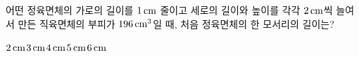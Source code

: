 어떤 정육면체의 가로의 길이를 $1\mkern3mu \mathrm{cm}$ 줄이고 세로의 길이와 높이를 각각 $2\mkern3mu \mathrm{cm}$씩 늘여서 만든 직육면체의 부피가 $196\mkern3mu \mathrm{cm}^3$일 때, 처음 정육면체의 한 모서리의 길이는?
\begin{choices32}{$2\mkern3mu \mathrm{cm}$}{$3\mkern3mu \mathrm{cm}$}{$4\mkern3mu \mathrm{cm}$}{$5\mkern3mu \mathrm{cm}$}{$6\mkern3mu \mathrm{cm}$}\end{choices32}
